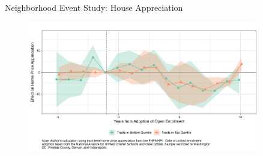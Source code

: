\documentclass[notes,11pt, aspectratio=169]{beamer}
\newenvironment{wideitemize}{\itemize\addtolength{\itemsep}{10pt}}{\enditemize}
\begin{document}
\begin{frame}{Neighborhood Event Study: House Appreciation}
\begin{figure}
\centering
\includegraphics[width=0.9\textwidth]{figures/event_study_appreciation.png}
\end{figure}
\end{frame}




\end{document}
